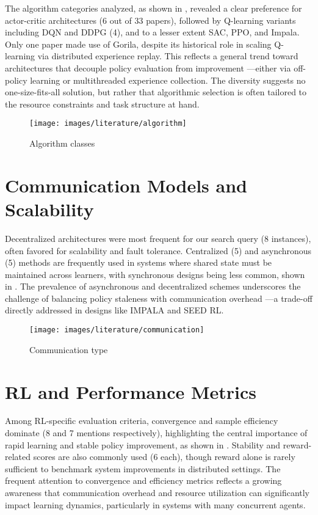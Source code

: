 The algorithm categories analyzed, as shown in , 
revealed a clear preference for actor-critic architectures (6 out of 33 papers),
followed by Q-learning variants including DQN and DDPG (4), and to a lesser extent SAC, PPO, and Impala.
Only one paper made use of Gorila, despite its historical role in scaling Q-learning via distributed experience replay.
This reflects a general trend toward architectures that decouple policy evaluation from improvement
---either via off-policy learning or multithreaded experience collection.
The diversity suggests no one-size-fits-all solution, 
but rather that algorithmic selection is often tailored to the resource constraints and task structure at hand.

\begin{figure}
    \centering
    \texttt{[image: images/literature/algorithm]}
    \caption{Algorithm classes}
    \label{fig:algorithm}
\end{figure}

\section{Communication Models and Scalability}
\label{sec:communication-models-and-scalability}

Decentralized architectures were most frequent for our search query (8 instances), often favored for scalability and fault tolerance.
Centralized (5) and asynchronous (5) methods are frequently used in systems where shared state must be maintained across learners,
with synchronous designs being less common, shown in .
The prevalence of asynchronous and decentralized schemes underscores the challenge of balancing policy staleness with communication overhead
---a trade-off directly addressed in designs like IMPALA and SEED RL.

\begin{figure}
    \centering
    \texttt{[image: images/literature/communication]}
    \caption{Communication type}
    \label{fig:communication_type}
\end{figure}

\section{RL and Performance Metrics}
\label{sec:rl-and-performance-metrics}

Among RL-specific evaluation criteria, convergence and sample efficiency dominate (8 and 7 mentions respectively),
highlighting the central importance of rapid learning and stable policy improvement, as shown in .
Stability and reward-related scores are also commonly used (6 each), 
though reward alone is rarely sufficient to benchmark system improvements in distributed settings.
The frequent attention to convergence and efficiency metrics reflects a 
growing awareness that communication overhead and resource utilization can significantly
impact learning dynamics, particularly in systems with many concurrent agents.

